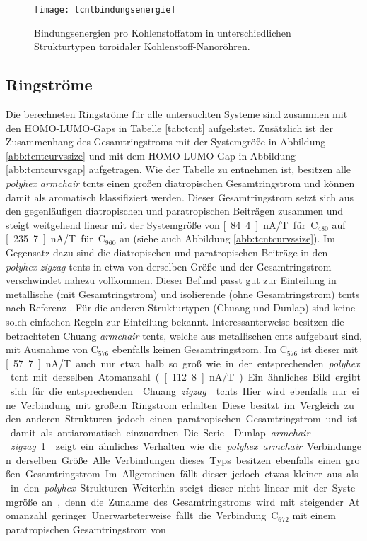\begin{figure}[ht!]
	\centering
	\texttt{[image: tcntbindungsenergie]}
	\captionsetup{figurewithin = chapter}
	\captionsetup{font=small, labelfont=bf}\caption[Bindungsenergien toroidaler Kohlenstoff-Nanoröhren]{Bindungsenergien pro Kohlenstoffatom in unterschiedlichen Strukturtypen toroidaler Kohlenstoff-Nanoröhren.}
\label{abb:tcntbindungsenergie}
\end{figure}

\subsection{Ringströme}

Die berechneten Ringströme für alle untersuchten Systeme sind zusammen mit den HOMO-LUMO-Gaps in Tabelle \ref{tab:tcnt} aufgelistet. Zusätzlich ist der Zusammenhang des Gesamtringstroms mit der Systemgröße in Abbildung \ref{abb:tcntcurvssize} und mit dem HOMO-LUMO-Gap in Abbildung \ref{abb:tcntcurvsgap} aufgetragen. Wie der Tabelle zu entnehmen ist, besitzen alle \textit{polyhex} \textit{armchair} \acp{tcnt} einen großen diatropischen Gesamtringstrom und können damit als aromatisch klassifiziert werden. Dieser Gesamtringstrom setzt sich aus den gegenläufigen diatropischen und paratropischen Beiträgen zusammen und steigt weitgehend linear mit der Systemgröße von \unit[84.4]{nA/T} für C$_{480}$ auf \unit[235.7]{nA/T} für C$_{960}$ an (siehe auch Abbildung \ref{abb:tcntcurvssize}). Im Gegensatz dazu sind die diatropischen und paratropischen Beiträge in den \textit{polyhex} \textit{zigzag} \acp{tcnt} in etwa von derselben Größe und der Gesamtringstrom verschwindet nahezu vollkommen. Dieser Befund passt gut zur Einteilung in metallische (mit Gesamtringstrom) und isolierende (ohne Gesamtringstrom) \acp{tcnt} nach Referenz \cite{zhang2005electronic}. Für die anderen Strukturtypen (Chuang und Dunlap) sind keine solch einfachen Regeln zur Einteilung bekannt. Interessanterweise besitzen die betrachteten \glqq Chuang \textit{armchair}\grqq{} \acp{tcnt}, welche aus metallischen \acp{cnt} aufgebaut sind, mit Ausnahme von C$_{576}$ ebenfalls keinen Gesamtringstrom. Im C$_{576}$ ist dieser mit \unit[57.7]{nA/T} auch nur etwa halb so groß wie in der entsprechenden \textit{polyhex} \ac{tcnt} mit derselben Atomanzahl (\unit[112.8]{nA/T}). Ein ähnliches Bild ergibt sich für die entsprechenden \glqq Chuang \textit{zigzag}\grqq{} \acp{tcnt}. Hier wird ebenfalls nur eine Verbindung mit großem Ringstrom erhalten. Diese besitzt im Vergleich zu den anderen Strukturen jedoch einen paratropischen Gesamtringstrom und ist damit als antiaromatisch einzuordnen. Die Serie \glqq Dunlap \textit{armchair}-\textit{zigzag} 1\grqq{} zeigt ein ähnliches Verhalten wie die \textit{polyhex} \textit{armchair} Verbindungen derselben Größe. Alle Verbindungen dieses Typs besitzen ebenfalls einen großen Gesamtringstrom. Im Allgemeinen fällt dieser jedoch etwas kleiner aus als in den \textit{polyhex} Strukturen. Weiterhin steigt dieser nicht linear mit der Systemgröße an, denn die Zunahme des Gesamtringstroms wird mit steigender Atomanzahl geringer. Unerwarteterweise fällt die Verbindung C$_{672}$ mit einem paratropischen Gesamtringstrom von 